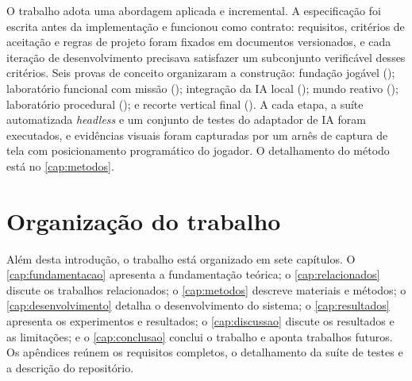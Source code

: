 O trabalho adota uma abordagem aplicada e incremental. A especificação foi
escrita antes da implementação e funcionou como contrato: requisitos,
critérios de aceitação e regras de projeto foram fixados em documentos
versionados, e cada iteração de desenvolvimento precisava satisfazer um
subconjunto verificável desses critérios. Seis provas de conceito organizaram
a construção: fundação jogável (); laboratório funcional com missão
(); integração da IA local (); mundo reativo ();
laboratório procedural (); e recorte vertical final (). A cada
etapa, a suíte automatizada \emph{headless} e um conjunto de testes do
adaptador de IA foram executados, e evidências visuais foram capturadas por um
arnês de captura de tela com posicionamento programático do jogador. O
detalhamento do método está no \autoref{cap:metodos}.

\section{Organização do trabalho}
\label{sec:organizacao}

Além desta introdução, o trabalho está organizado em sete capítulos. O
\autoref{cap:fundamentacao} apresenta a fundamentação teórica; o
\autoref{cap:relacionados} discute os trabalhos relacionados; o
\autoref{cap:metodos} descreve materiais e métodos; o
\autoref{cap:desenvolvimento} detalha o desenvolvimento do sistema; o
\autoref{cap:resultados} apresenta os experimentos e resultados; o
\autoref{cap:discussao} discute os resultados e as limitações; e o
\autoref{cap:conclusao} conclui o trabalho e aponta trabalhos futuros. Os
apêndices reúnem os requisitos completos, o detalhamento da suíte de testes e
a descrição do repositório.
